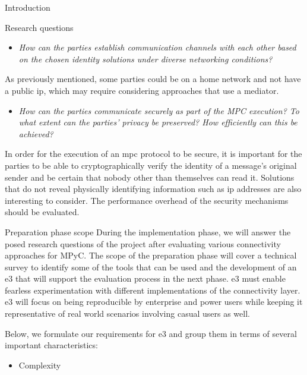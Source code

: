 \begin{frame}{Introduction}
\begin{block}{Research questions}
\begin{itemize}
\tightlist
\item
  \emph{How can the parties establish communication channels with each
  other based on the chosen identity solutions under diverse networking
  conditions?}
\end{itemize}

As previously mentioned, some parties could be on a home network and not
have a public \gls{ip}, which may require considering approaches that
use a mediator.

\begin{itemize}
\tightlist
\item
  \emph{How can the parties communicate securely as part of the MPC
  execution? To what extent can the parties' privacy be preserved? How
  efficiently can this be achieved?}
\end{itemize}

In order for the execution of an \gls{mpc} protocol to be secure, it is
important for the parties to be able to cryptographically verify the
identity of a message's original sender and be certain that nobody other
than themselves can read it. Solutions that do not reveal physically
identifying information such as \gls{ip} addresses are also interesting
to consider. The performance overhead of the security mechanisms should
be evaluated.
\end{block}

\begin{block}{Preparation phase scope}
\protect\hypertarget{preparation-phase-scope}{}
During the implementation phase, we will answer the posed research
questions of the project after evaluating various connectivity
approaches for MPyC. The scope of the preparation phase will cover a
technical survey to identify some of the tools that can be used and the
development of an \gls{e3} that will support the evaluation process in
the next phase. \gls{e3} must enable fearless experimentation with
different implementations of the connectivity layer. \gls{e3} will focus
on being reproducible by enterprise and power users while keeping it
representative of real world scenarios involving casual users as well.

Below, we formulate our requirements for \gls{e3} and group them in
terms of several important characteristics:

\begin{itemize}
\tightlist
\item
  Complexity


\end{itemize}
\end{block}
\end{frame}
